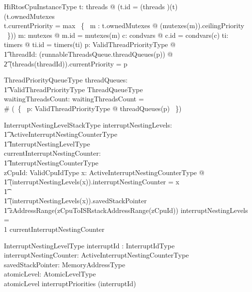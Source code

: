 \documentclass[11pt,letterpaper,twoside,openany]{book}
\begin{document}
\begin{schema}{HiRtosCpuInstanceType}
\also
    \forall t: \ran threads @ (t.id = (threads \inv)(t) \land \\
    (t.ownedMutexes \neq \emptyset \implies \\
     t.currentPriority = max~ \{~ m : \ran t.ownedMutexes @ (mutexes(m)).ceilingPriority ~\}))
\also
    \forall m: \ran mutexes @ m.id = mutexes\inv(m)
\also
    \forall c: \ran condvars @  c.id = condvars\inv(c)
\also
    \forall ti: \ran timers @ ti.id = timers\inv(ti)
\also
    \forall p: ValidThreadPriorityType @ \\
\t1    \forall threadId: \ran (runnableThreadsQueue.threadQueues(p)) @ \\
\t2    (threads(threadId)).currentPriority = p
\end{schema}

\begin{schema}{ThreadPriorityQueueType}
    threadQueues: \\
    \t1 ValidThreadPriorityType \inj ThreadQueueType \\
    waitingThreadsCount: \nat
\where
   waitingThreadsCount = \\
   \# (\bigcup ~\{~ p: ValidThreadPriorityType @ threadQueues(p) ~\})
\end{schema}

\begin{schema}{InterruptNestingLevelStackType}
       interruptNestingLevels: \\
    \t1 ActiveInterruptNestingCounterType \inj \\
    \t1 InterruptNestingLevelType \\
    currentInterruptNestingCounter: \\
    \t1 InterruptNestingCounterType \\
    zCpuId: ValidCpuIdType
\where
   \forall x: ActiveInterruptNestingCounterType @ \\
\t1   (interruptNestingLevels(x)).interruptNestingCounter = x \\
\t1   \land \\
\t1   (interruptNestingLevels(x)).savedStackPointer \in \\
\t1        zAddressRange(zCpuToISRstackAddressRange(zCpuId))
\also
   \dom interruptNestingLevels = \\
   1 \upto currentInterruptNestingCounter
\end{schema}

\begin{schema}{InterruptNestingLevelType}
   interruptId : InterruptIdType \\
   interruptNestingCounter: ActiveInterruptNestingCounterType \\
   savedStackPointer: MemoryAddressType \\
   atomicLevel: AtomicLevelType \\
\where
   atomicLevel \leq interruptPriorities (interruptId)
\also

\end{schema}
\end{document}
